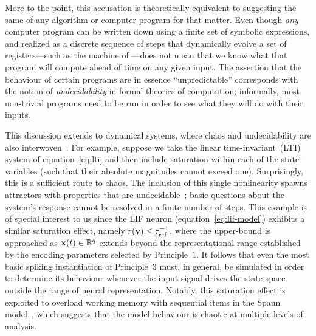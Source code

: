 More to the point, this accusation is theoretically equivalent to suggesting the same of any algorithm or computer program for that matter.
Even though \emph{any} computer program can be written down using a finite set of symbolic expressions, and realized as a discrete sequence of steps that dynamically evolve a set of registers---such as the machine of \citet{turing1938computable}---does not mean that we know what that program will compute ahead of time on any given input.
The assertion that the behaviour of certain programs are in essence ``unpredictable'' corresponds with the notion of \emph{undecidability} in formal theories of computation; informally, most non-trivial programs need to be run in order to see what they will do with their inputs.

This discussion extends to dynamical systems, where chaos and undecidability are also interwoven~\citep{moore1991generalized}.
For example, suppose we take the linear time-invariant~(LTI) system of equation~\ref{eq:lti} and then include saturation within each of the state-variables (such that their absolute magnitudes cannot exceed one).
Surprisingly, this is a sufficient route to chaos.
The inclusion of this single nonlinearity spawns attractors with properties that are undecidable~\citep{blondel2001stability}; basic questions about the system's response cannot be resolved in a finite number of steps.
This example is of special interest to us since the LIF neuron (equation~\ref{eq:lif-model}) exhibits a similar saturation effect, namely $r(\mathbf{v}) \le \tau_\text{ref}^{-1}$, where the upper-bound is approached as $\mathbf{x}(t) \in \mathbb{R}^q$ extends beyond the representational range established by the encoding parameters selected by Principle~1.
It follows that even the most basic spiking instantiation of Principle~3 must, in general, be simulated in order to determine its behaviour whenever the input signal drives the state-space outside the range of neural representation.
Notably, this saturation effect is exploited to overload working memory with sequential items in the Spaun model~\citep{eliasmith2012}, which suggests that the model behaviour is chaotic at multiple levels of analysis.

